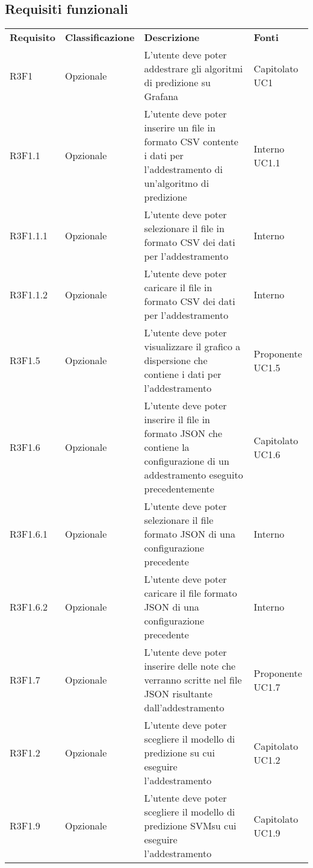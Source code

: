 \subsection{Requisiti funzionali}
\hskip-3pt
	\setcounter{table}{0}
	\begin{longtable} {
		>{}p{24mm} 
		>{}p{32mm}
		>{}p{40mm} 
		>{}p{24.5mm}
		}
	\rowcolor{gray!50}
		\textbf{Requisito} & \textbf{Classificazione} & \textbf{Descrizione} & \textbf{Fonti} 	\TBstrut \\
		R3F1 & Opzionale & L'utente deve poter addestrare gli algoritmi di predizione su Grafana\glo & Capitolato UC1 \TBstrut \\ [2mm]
		R3F1.1 & Opzionale & L'utente deve poter inserire un file in formato CSV contente i dati per l'addestramento di un'algoritmo di predizione & Interno UC1.1 \TBstrut \\ [2mm]
		R3F1.1.1 & Opzionale & L'utente deve poter selezionare il file in formato CSV dei dati per l'addestramento & Interno \TBstrut \\ [2mm]
		R3F1.1.2 & Opzionale & L'utente deve poter caricare il file in formato CSV dei dati per l'addestramento & Interno \TBstrut \\ [2mm]
		R3F1.5 & Opzionale & L'utente deve poter visualizzare il grafico a dispersione che contiene i dati per l'addestramento & Proponente UC1.5 \TBstrut \\ [2mm]
		R3F1.6 & Opzionale & L'utente deve poter inserire il file in formato JSON che contiene la configurazione di un addestramento eseguito precedentemente & Capitolato UC1.6 \TBstrut \\ [2mm]
		R3F1.6.1 & Opzionale & L'utente deve poter selezionare il file formato JSON di una configurazione precedente & Interno \TBstrut \\ [2mm]
		R3F1.6.2 & Opzionale & L'utente deve poter caricare il file formato JSON di una configurazione precedente & Interno \TBstrut \\ [2mm]
		R3F1.7 & Opzionale & L'utente deve poter inserire delle note che verranno scritte nel file JSON risultante dall'addestramento & Proponente UC1.7 \TBstrut \\ [2mm]
		R3F1.2 & Opzionale & L'utente deve poter scegliere il modello di predizione su cui eseguire l'addestramento & Capitolato UC1.2 \TBstrut \\ [2mm]
		R3F1.9 & Opzionale & L'utente deve poter scegliere il modello di predizione SVM\glosp su cui eseguire l'addestramento & Capitolato UC1.9 \TBstrut \\ [2mm]

\end{longtable}
